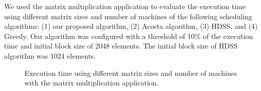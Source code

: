 \documentclass[journal]{IEEEtran}
\begin{document}
We used the matrix multiplication application to evaluate the execution time
using different matrix sizes and number of machines of the following scheduling
algorithms: (1) our proposed algorithm, (2) Acosta algorithm, (3) HDSS, and (4)
Greedy. Our algorithm was configured with a threshold of 10\% of the execution
time and initial block size of 2048 elements. The initial block size of HDSS
algorithm was 1024 elements.

\begin{figure}[htb]
	\begin{center}
	\centering
	\caption{Execution time using different matrix sizes and number of
          machines with the matrix multiplication application.}
	\label{fig:todosJuntos}
	\end{center}
\end{figure}
\end{document}

